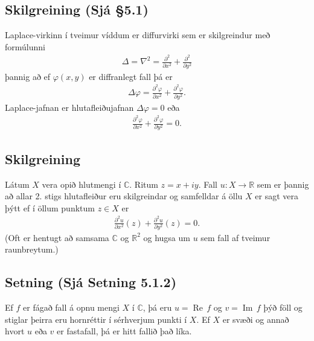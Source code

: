\documentclass[a4paper,10pt,icelandic]{sphinxmanual}
\begin{document}
\subsection{Skilgreining (Sjá \S{}5.1)}
\label{\detokenize{Kafli05:skilgreining-sja-5-1}}
Laplace-virkinn í tveimur víddum er diffurvirki sem er skilgreindur með formúlunni
\begin{equation*}
\begin{split}\Delta=\nabla^2 = \frac{\partial^2 }{\partial x^2}+\frac{\partial^2}{\partial y^2}\end{split}
\end{equation*}
þannig að ef \(\varphi(x,y)\) er diffranlegt fall þá er
\begin{equation*}
\begin{split}\Delta\varphi=\frac{\partial^2 \varphi}{\partial x^2}
+\frac{\partial^2\varphi}{\partial y^2}.\end{split}
\end{equation*}
Laplace-jafnan er hlutafleiðujafnan \(\Delta\varphi=0\) eða
\begin{equation*}
\begin{split}\frac{\partial^2 \varphi}{\partial x^2}
+\frac{\partial^2\varphi}{\partial y^2}=0.\end{split}
\end{equation*}

\subsection{Skilgreining}
\label{\detokenize{Kafli05:skilgreining}}
Látum \(X\) vera opið hlutmengi í \({\mathbb{C}}\). Ritum \(z=x+iy\). Fall \(u:X\to {\mathbb{R}}\) sem er þannig að allar 2. stigs hlutafleiður eru skilgreindar og samfelldar á öllu \(X\) er sagt vera þýtt ef í öllum punktum \(z\in  X\) er
\begin{equation*}
\begin{split}\frac{\partial^2 u}{\partial x^2}(z)
+\frac{\partial^2 u}{\partial y^2}(z)=0.\end{split}
\end{equation*}
(Oft er hentugt að samsama \({\mathbb{C}}\) og \({\mathbb{R}}^2\) og hugsa um \(u\) sem fall af tveimur raunbreytum.)


\subsection{Setning (Sjá Setning 5.1.2)}
\label{\detokenize{Kafli05:setning-sja-setning-5-1-2}}
Ef \(f\) er fágað fall á opnu mengi \(X\) í \({\mathbb{C}}\), þá eru \(u=\operatorname{Re\, } f\) og \(v=\operatorname{Im\, } f\) þýð föll og stiglar þeirra eru hornréttir í sérhverjum punkti í \(X\). Ef \(X\) er svæði og annað hvort \(u\) eða \(v\) er fastafall, þá er hitt fallið það líka.
\end{document}
